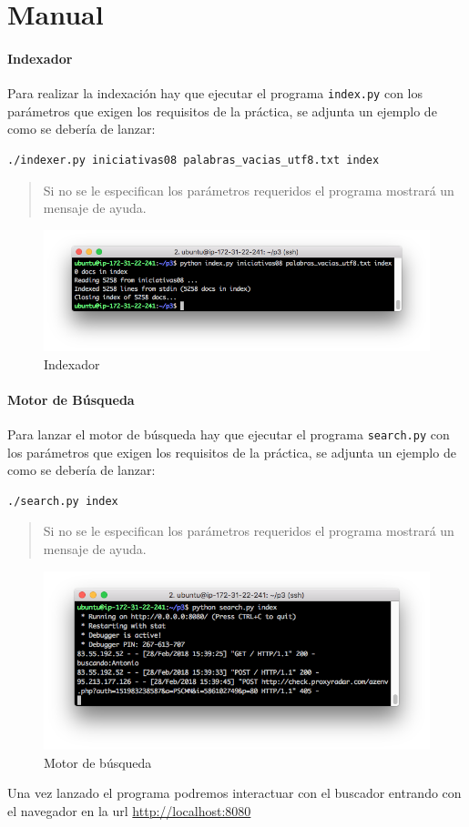 \chapter{Manual}

\subsubsection{Indexador}

Para realizar la indexación hay que ejecutar el programa
\texttt{index.py} con los parámetros que exigen los requisitos de la
práctica, se adjunta un ejemplo de como se debería de lanzar:

\begin{lstlisting}
./indexer.py iniciativas08 palabras_vacias_utf8.txt index
\end{lstlisting}

\begin{quote}
Si no se le especifican los parámetros requeridos el programa mostrará
un mensaje de ayuda.
\end{quote}

\begin{figure}
\centering
\includegraphics[width=1.0\textwidth]{../images/index.png}
\caption{Indexador}
\end{figure}

\subsubsection{Motor de Búsqueda}

Para lanzar el motor de búsqueda hay que ejecutar el programa
\texttt{search.py} con los parámetros que exigen los requisitos de la práctica, se adjunta un ejemplo de como se debería de lanzar:

\begin{lstlisting}
./search.py index
\end{lstlisting}

\begin{quote}
Si no se le especifican los parámetros requeridos el programa mostrará un mensaje de ayuda.
\end{quote}

\begin{figure}
\centering
\includegraphics[width=1.0\textwidth]{../images/search.png}
\caption{Motor de búsqueda}
\end{figure}

Una vez lanzado el programa podremos interactuar con el buscador
entrando con el navegador en la url \url{http://localhost:8080}